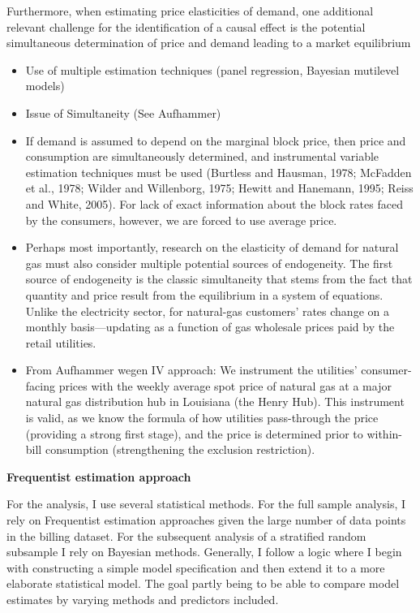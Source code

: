 \documentclass[12pt,twoside]{reedthesis}
\begin{document}
Furthermore, when estimating price elasticities of demand, one additional relevant challenge for the identification of a causal effect is the potential simultaneous determination of price and demand leading to a market equilibrium
\begin{itemize}
\item
  Use of multiple estimation techniques (panel regression, Bayesian mutilevel models)
\item
  Issue of Simultaneity (See Aufhammer)
\item
  If demand is assumed to depend on the marginal block price, then price and consumption are simultaneously determined, and instrumental variable estimation techniques must be used (Burtless and Hausman, 1978; McFadden et al., 1978; Wilder and Willenborg, 1975; Hewitt and Hanemann, 1995; Reiss and White, 2005). For lack of exact information about the block rates faced by the consumers, however, we are forced to use average price.
\item
  Perhaps most importantly, research on the elasticity of demand for natural gas must also consider multiple potential sources of endogeneity. The first source of endogeneity is the classic simultaneity that stems from the fact that quantity and price result from the equilibrium in a system of equations. Unlike the electricity sector, for natural-gas customers' rates change on a monthly basis---updating as a function of gas wholesale prices paid by the retail utilities.
\item
  From Aufhammer wegen IV approach: We instrument the utilities' consumer-facing prices with the weekly average spot price of natural gas at a major natural gas distribution hub in Louisiana (the Henry Hub). This instrument is valid, as we know the formula of how utilities pass-through the price (providing a strong first stage), and the price is determined prior to within-bill consumption (strengthening the exclusion restriction).
\end{itemize}
\textbf{Frequentist estimation approach}

For the analysis, I use several statistical methods. For the full sample analysis, I rely on Frequentist estimation approaches given the large number of data points in the billing dataset. For the subsequent analysis of a stratified random subsample I rely on Bayesian methods. Generally, I follow a logic where I begin with constructing a simple model specification and then extend it to a more elaborate statistical model. The goal partly being to be able to compare model estimates by varying methods and predictors included.
\end{document}
